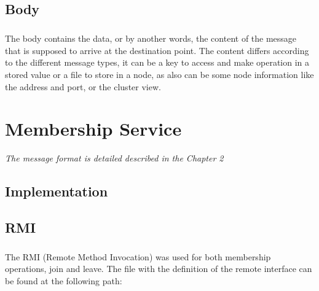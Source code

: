 \documentclass{report}
\begin{document}
			\section{Body}
	
				\paragraph{} The body contains the data, or by another words, the
				content of the message that is supposed to arrive at the destination point.
				The content differs according to the different message types, it
				can be a key to access and make operation in a stored value or a
				file to store in a node, as also can be some node information like the address
				and port, or the cluster view.

	\chapter{Membership Service}
			\emph{The message format is detailed described in the Chapter 2}

	        \paragraph{} 
	        
	        \paragraph{}

			\section{Implementation}
	
				\paragraph{}
				
				\paragraph{}

			\section{RMI}
				\paragraph{} The RMI (Remote Method Invocation) was used for both
				membership operations, join and leave. The file with the definition 
				of the remote interface can be found at the following path:
\end{document}
